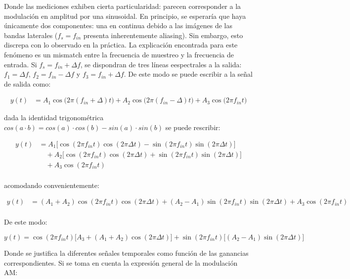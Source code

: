 \noindent Donde las mediciones exhiben cierta particularidad: parecen corresponder a la modulación en amplitud por una sinusoidal. En principio, se esperaría que haya únicamente dos componentes: una en continua debido a las imágenes de las bandas laterales ($f_s = f_{in}$ presenta inherentemente aliasing). Sin embargo, esto discrepa con lo observado en la práctica. La explicación encontrada para este fenómeno es un mismatch entre la frecuencia de muestreo y la frecuencia de entrada. Si $f_{s} = f_{in} + \Delta f$, se dispondran de tres líneas eespectrales a la salida: $f_1 = \Delta f$, $f_2 = f_{in}-\Delta f$ y $f_3 = f_{in} + \Delta f$. De este modo se puede escribir a la señal de salida como:

\begin{align*}
y(t) &= A_1 \cos\big(2\pi(f_{in}+\Delta)t\big) 
     + A_2 \cos\big(2\pi(f_{in}-\Delta)t\big) 
     + A_3 \cos\big(2\pi f_{in} t\big)
\end{align*}

\noindent dada la identidad trigonométrica $cos(a\cdot b) = cos(a) \cdot cos(b) - sin(a) \cdot sin(b)$ se puede rescribir:

\begin{align*}
    y(t) &= A_1 \big[\cos(2\pi f_{in} t)\cos(2\pi \Delta t) - \sin(2\pi f_{in} t)\sin(2\pi \Delta t)\big] \\  
    &\quad + A_2 \big[\cos(2\pi f_{in} t)\cos(2\pi \Delta t) + \sin(2\pi f_{in} t)\sin(2\pi \Delta t)\big] \\
&\quad + A_3 \cos(2\pi f_{in} t) \\[6pt]
\end{align*}

\noindent acomodando convenientemente:


\begin{align*}
y(t) &= (A_1 + A_2)\cos(2\pi f_{in} t)\cos(2\pi \Delta t) + (A_2 - A_1)\sin(2\pi f_{in} t)\sin(2\pi \Delta t) + A_3 \cos(2\pi f_{in} t) \\[6pt]
\end{align*}

\noindent De este modo:

\begin{equation}\label{eq: 5b AM trucha}
    y(t)= \cos(2\pi f_{in} t)\big[A_3 + (A_1 + A_2)\cos(2\pi \Delta t)\big] + \sin(2\pi f_{in} t)\big[(A_2 - A_1)\sin(2\pi \Delta t)\big]
\end{equation}

\noindent Donde se justifica la diferentes señales temporales como función de las ganancias correspondientes. Si se toma en cuenta la expresión general de la modulación AM:

